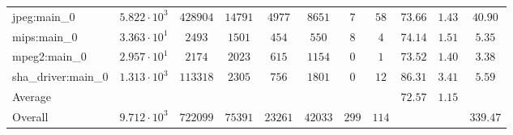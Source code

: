 \begin{tabular}{|l|c|c|c|c|c|c|c|c|c|c|}
jpeg:main\_0            & $ 5.822 \cdot 10^{3} $ & $ 428904 $ & $ 14791 $ & $ 4977  $ & $ 8651  $ & $ 7   $ & $ 58  $ & $ 73.66       $ & $ 1.43    $ & $ 40.90   $ \\
mips:main\_0            & $ 3.363 \cdot 10^{1} $ & $ 2493   $ & $ 1501  $ & $ 454   $ & $ 550   $ & $ 8   $ & $ 4   $ & $ 74.14       $ & $ 1.51    $ & $ 5.35    $ \\
mpeg2:main\_0           & $ 2.957 \cdot 10^{1} $ & $ 2174   $ & $ 2023  $ & $ 615   $ & $ 1154  $ & $ 0   $ & $ 1   $ & $ 73.52       $ & $ 1.40    $ & $ 3.38    $ \\
sha\_driver:main\_0     & $ 1.313 \cdot 10^{3} $ & $ 113318 $ & $ 2305  $ & $ 756   $ & $ 1801  $ & $ 0   $ & $ 12  $ & $ 86.31       $ & $ 3.41    $ & $ 5.59    $ \\
\hline
Average                 & $                    $ & $        $ & $       $ & $       $ & $       $ & $     $ & $     $ & $ 72.57       $ & $ 1.15    $ & $         $ \\
\hline
Overall                 & $ 9.712 \cdot 10^{3} $ & $ 722099 $ & $ 75391 $ & $ 23261 $ & $ 42033 $ & $ 299 $ & $ 114 $ & $             $ & $         $ & $ 339.47  $ \\
\hline
\end{tabular}
